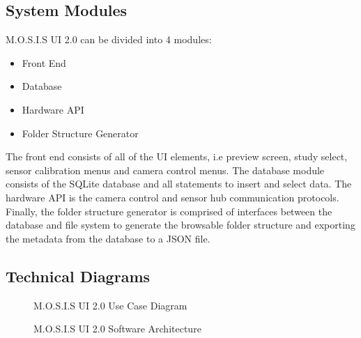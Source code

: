 \subsection{System Modules}
M.O.S.I.S UI 2.0 can be divided into 4 modules:
\begin{itemize}
	\item Front End
	\item Database
	\item Hardware API
	\item Folder Structure Generator
\end{itemize}
The front end consists of all of the UI elements, i.e preview screen, study select, sensor calibration menus and camera control menus.\cite{UnifiedModelingLanguage}
The database module consists of the SQLite database and all statements to insert and select data.\cite{kelechavaSQLStandardISO2018}\cite{UnifiedModelingLanguage} The hardware API is the camera control and sensor hub communication protocols. Finally, the folder structure generator is comprised of interfaces between the database and file system to generate the browsable folder structure and exporting the metadata from the database to a JSON file.\cite{JPEGJPEG}\cite{JSON}
\subsection{Technical Diagrams}
\begin{center}
	\begin{figure}[H]
		\centering
		\caption*{M.O.S.I.S UI 2.0 Use Case Diagram}
	\end{figure}
	\begin{figure}[H]
		\caption*{M.O.S.I.S UI 2.0 Software Architecture}
	\end{figure}
\end{center}